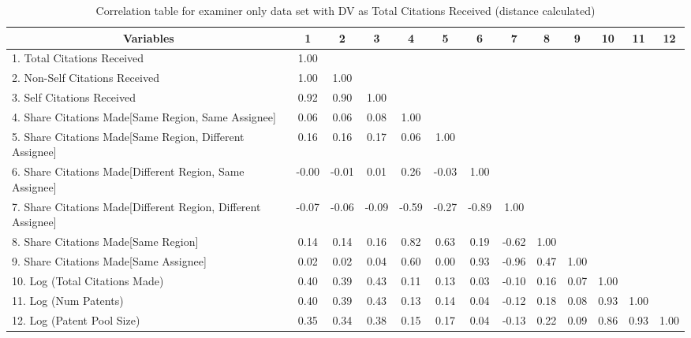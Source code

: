 \begin{table}[htbp]\centering \caption{Correlation table for examiner only data set with DV as Total Citations Received (distance calculated)\label{e.tcorrelation}}
\scriptsize
\singlespacing
\begin{adjustbox}{angle=90}
\begin{tabular}{l  c  c  c  c  c  c  c  c  c  c  c  c }\hline\hline
\multicolumn{1}{c}{Variables} &1&2&3&4&5&6&7&8&9&10&11&12\\ \hline
1. Total Citations Received&1.00\\
2. Non-Self Citations Received&1.00&1.00\\
3. Self Citations Received&0.92&0.90&1.00\\
4. Share Citations Made[Same Region, Same Assignee]&0.06&0.06&0.08&1.00\\
5. Share Citations Made[Same Region, Different Assignee]&0.16&0.16&0.17&0.06&1.00\\
6. Share Citations Made[Different Region, Same Assignee]&-0.00&-0.01&0.01&0.26&-0.03&1.00\\
7. Share Citations Made[Different Region, Different Assignee]&-0.07&-0.06&-0.09&-0.59&-0.27&-0.89&1.00\\
8. Share Citations Made[Same Region]&0.14&0.14&0.16&0.82&0.63&0.19&-0.62&1.00\\
9. Share Citations Made[Same Assignee]&0.02&0.02&0.04&0.60&0.00&0.93&-0.96&0.47&1.00\\
10. Log (Total Citations Made)&0.40&0.39&0.43&0.11&0.13&0.03&-0.10&0.16&0.07&1.00\\
11. Log (Num Patents)&0.40&0.39&0.43&0.13&0.14&0.04&-0.12&0.18&0.08&0.93&1.00\\
12. Log (Patent Pool Size)&0.35&0.34&0.38&0.15&0.17&0.04&-0.13&0.22&0.09&0.86&0.93&1.00\\
\hline \hline 
 \end{tabular}
 \end{adjustbox}
\end{table}

